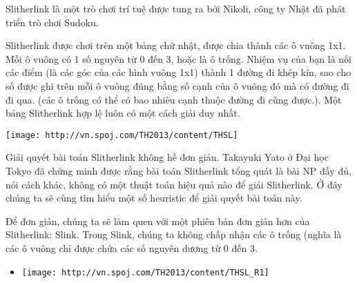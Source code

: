 

Slitherlink là một trò chơi trí tuệ được tung ra bởi Nikoli, công ty Nhật đã phát triển trò chơi Sudoku.

Slitherlink được chơi trên một bảng chữ nhật, được chia thành các ô vuông 1x1. Mỗi ô vuông có 1 số nguyên từ 0 đến 3, hoặc là ô trống. Nhiệm vụ của bạn là nối các điểm (là các góc của các hình vuông 1x1) thành 1 đường đi khép kín, sao cho số được ghi trên mỗi ô vuông đúng bằng số cạnh của ô vuông đó mà có đường đi đi qua. (các ô trống có thể có bao nhiêu cạnh thuộc đường đi cũng được.). Một bảng Slitherlink hợp lệ luôn có một cách giải duy nhất.


\texttt{[image: http://vn.spoj.com/TH2013/content/THSL]}

Giải quyết bài toán Slitherlink không hề đơn giản. Takayuki Yato ở Đại học Tokyo đã chứng minh được rằng bài toán Slitherlink tổng quát là bài NP đầy đủ, nói cách khác, không có một thuật toán hiệu quả nào để giải Slitherlink. Ở đây chúng ta sẽ cùng tìm hiểu một số heuristic để giải quyết bài toán này.

Để đơn giản, chúng ta sẽ làm quen với một phiên bản đơn giản hơn của Slitherlink: Slink. Trong Slink, chúng ta không chấp nhận các ô trống (nghĩa là các ô vuông chỉ được chứa các số nguyên dương từ 0 đến 3.
\begin{itemize}
	\item 
\texttt{[image: http://vn.spoj.com/TH2013/content/THSL\_R1]}   
\end{itemize}

